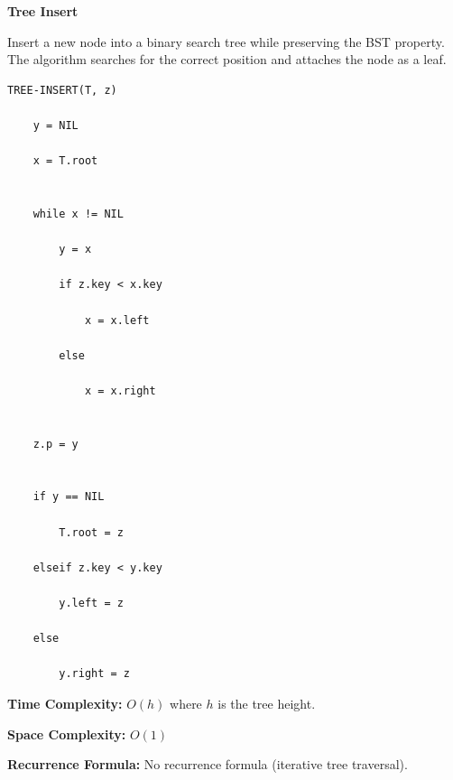 \documentclass[a4paper,12pt]{article}
\begin{document}
\begin{tcolorbox}[
    colback=gray!30,
    colframe=black,
    boxrule=1pt,
    arc=0mm
]

\begin{tcolorbox}[
    colback=gray!10,
    colframe=black,
    arc=0mm
]
\centering
{\Huge\bfseries Tree Insert}
\end{tcolorbox}


\begin{tcolorbox}[
    colback=gray!10,
    colframe=black,
    arc=0mm
]
\small
Insert a new node into a binary search tree while preserving the BST property.
The algorithm searches for the correct position and attaches the node as a leaf.
\end{tcolorbox}


\begin{tcolorbox}[
    colback=black!5,
    colframe=black,
    arc=0mm,
    title=Pseudo-code
]
\tiny
\begin{lstlisting}
TREE-INSERT(T, z)

    y = NIL

    x = T.root


    while x != NIL

        y = x

        if z.key < x.key

            x = x.left

        else

            x = x.right


    z.p = y


    if y == NIL

        T.root = z

    elseif z.key < y.key

        y.left = z

    else

        y.right = z
\end{lstlisting}
\end{tcolorbox}


\begin{tcolorbox}[
    colback=cyan!20,
    colframe=black,
    arc=0mm
]
\small
\textbf{Time Complexity:}
$O(h)$ where $h$ is the tree height.
\end{tcolorbox}


\begin{tcolorbox}[
    colback=violet!20,
    colframe=black,
    arc=0mm
]
\small
\textbf{Space Complexity:}
$O(1)$
\end{tcolorbox}


\begin{tcolorbox}[
    colback=pink!20,
    colframe=black,
    arc=0mm
]
\small
\textbf{Recurrence Formula:}
No recurrence formula (iterative tree traversal).
\end{tcolorbox}

\end{tcolorbox}
\end{document}
